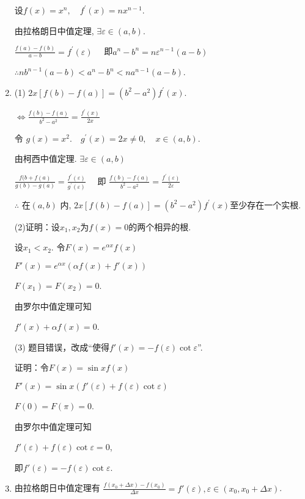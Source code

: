 \documentclass{article}
\begin{document}
\begin{enumerate}[1.]
				设$f(x)=x^{n}, \quad f^{\prime}(x)=n x^{n-1}.$
				
				由拉格朗日中值定理, $\exists \varepsilon\in(a, b)$.
				
				$\frac{f(a)-f(b)}{a-b}=f^{\prime}(\varepsilon) \quad$ 即$a^{n}-b^{n}=n \varepsilon^{n-1}(a-b)$
				
				$\therefore n b^{n-1}(a-b)<a^{n}-b^{n}<n a^{n-1}(a-b)$.
			
			\item (1) $2x[f(b)-f(a)]=\left(b^{2}-a^{2}\right) f^{\prime}(x)$.
			
				$\Leftrightarrow \frac{f(b)-f(a)}{b^{2}-a^{2}}=\frac{f^{\prime}(x)}{2 x}$
				
				令 $g(x)=x^{2} . \quad g^{\prime}(x)=2 x \neq 0, \quad x \in(a, b)$.
			
			 	由柯西中值定理. $\exists \varepsilon\in (a, b)$
			
				$\frac{f(b+f(a)}{g(b)-g(a)}=\frac{f^{\prime}(\varepsilon)}{g^{\prime}(\varepsilon)} \quad$ 即 $\frac{f(b)-f(a)}{b^{2}-a^{2}}=\frac{f^{\prime}(\varepsilon)}{2 \varepsilon}$
			
				$\therefore$ 在$(a, b)$ 内, $2 x[f(b)-f(a)]=\left(b^{2}-a^{2}\right) f^{\prime}(x)$至少存在一个实根.
			
				(2)证明：设$x_1, x_2$为$f(x)=0$的两个相异的根.
			
				设$x_1<x_2.$ 令$F(x)=e^{\alpha x}f(x)$
				
				$F'(x)=e^{\alpha x}(\alpha f(x)+f'(x))$
				
				$F(x_1)=F(x_2)=0$.
				
				由罗尔中值定理可知
				
				$f'(x)+\alpha f(x)=0$.
				
				(3) 题目错误，改成“使得$f'(x)=-f(\varepsilon)\cot \varepsilon$”.
				
				证明：令$F(x)=\sin xf(x)$
				
				$F'(x)=\sin x(f'(\varepsilon)+f(\varepsilon)\cot \varepsilon)$
				
				$F(0)=F(\pi)=0$.
				
				由罗尔中值定理可知
				
				$f'(\varepsilon)+f(\varepsilon)\cot \varepsilon=0$,
				
				即$f'(\varepsilon)=-f(\varepsilon)\cot \varepsilon$.
			
			\item 由拉格朗日中值定理有 $\frac{f(x_0+\varDelta x)-f(x_0)}{\varDelta x}=f'(\varepsilon), \varepsilon\in (x_0, x_0+\varDelta x)$.
			

\end{enumerate}
\end{document}
